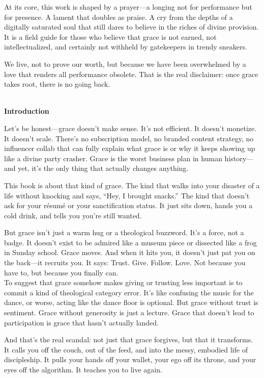 \documentclass[a4paper,11pt]{book}
\begin{document}
At its core, this work is shaped by a prayer—a longing not for performance but for presence. A lament that doubles as praise. A cry from the depths of a digitally saturated soul that still dares to believe in the riches of divine provision. It is a field guide for those who believe that grace is not earned, not intellectualized, and certainly not withheld by gatekeepers in trendy sneakers.

We live, not to prove our worth, but because we have been overwhelmed by a love that renders all performance obsolete. That is the real disclaimer: once grace takes root, there is no going back.

\begin{center}
\textbf{\\Introduction\\}
\end{center}

Let’s be honest—grace doesn’t make sense. It’s not efficient. It doesn’t monetize. It doesn’t scale. There’s no subscription model, no branded content strategy, no influencer collab that can fully explain what grace is or why it keeps showing up like a divine party crasher. Grace is the worst business plan in human history—and yet, it’s the only thing that actually changes anything.

This book is about that kind of grace. The kind that walks into your disaster of a life without knocking and says, “Hey, I brought snacks.” The kind that doesn't ask for your résumé or your sanctification status. It just sits down, hands you a cold drink, and tells you you're still wanted.

But grace isn’t just a warm hug or a theological buzzword. It’s a force, not a badge. It doesn’t exist to be admired like a museum piece or dissected like a frog in Sunday school. Grace moves. And when it hits you, it doesn’t just pat you on the back—it recruits you. It says: Trust. Give. Follow. Love. Not because you have to, but because you finally can.\\

To suggest that grace somehow makes giving or trusting less important is to commit a kind of theological category error. It’s like confusing the music for the dance, or worse, acting like the dance floor is optional. But grace without trust is sentiment. Grace without generosity is just a lecture. Grace that doesn’t lead to participation is grace that hasn’t actually landed.

And that’s the real scandal: not just that grace forgives, but that it transforms. It calls you off the couch, out of the feed, and into the messy, embodied life of discipleship. It pulls your hands off your wallet, your ego off its throne, and your eyes off the algorithm. It teaches you to live again.\\
\end{document}
